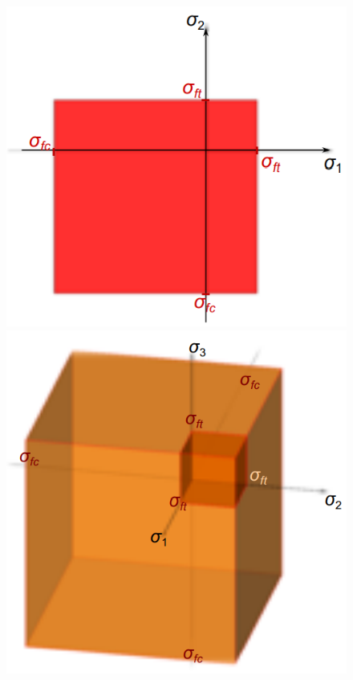 \documentclass[class=report, crop=false, 12pt,a4paper]{standalone}
\begin{document}
\begin{figure}
  \begin{center}
    \begin{minipage}[b]{0.46\textwidth}
      \centering
      \includegraphics[width = \textwidth]{../img/diagram78.png}
      \caption{}
    \end{minipage}
    \begin{minipage}[b]{0.46\textwidth}
      \centering
      \includegraphics[width = \textwidth]{../img/diagram79.png}
      \caption{}
    \end{minipage}
  \end{center}
\end{figure}
\end{document}
